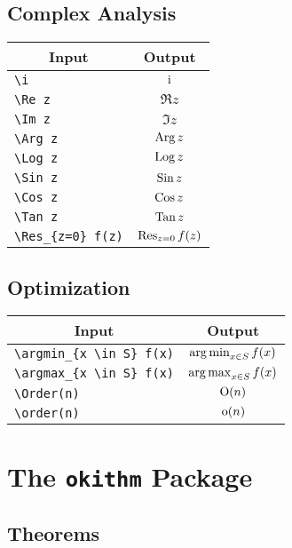 \documentclass[a4paper, 11pt]{article}
\begin{document}
\subsection{Complex Analysis}
\begin{center}
  \begin{tabular}{lc} \toprule
    \multicolumn{1}{c}{Input} & Output            \\\midrule
    \verb|\i|   & $\mathrm{i}$              \\
    \verb|\Re z|   & $\Re z$           \\
    \verb|\Im z|   & $\Im z$           \\
    \verb|\Arg z|   & $\operatorname{Arg} z$          \\
    \verb|\Log z|   & $\operatorname{Log} z$          \\
    \verb|\Sin z|   & $\operatorname{Sin} z$          \\
    \verb|\Cos z|   & $\operatorname{Cos} z$          \\
    \verb|\Tan z|   & $\operatorname{Tan} z$          \\
    \verb|\Res_{z=0} f(z)|   & $\operatorname*{Res}_{z=0} f(z)$ \\
    \bottomrule
  \end{tabular}
\end{center}

\subsection{Optimization}
\begin{center}
  \begin{tabular}{lc} \toprule
    \multicolumn{1}{c}{Input} & Output                   \\\midrule
    \verb|\argmin_{x \in S} f(x)|   & $\operatorname*{arg\,min}_{x \in S} f(x)$ \\
    \verb|\argmax_{x \in S} f(x)|   & $\operatorname*{arg\,max}_{x \in S} f(x)$ \\
    \verb|\Order(n) |   & $\operatorname{O}(n)$              \\
    \verb|\order(n) |  & $\operatorname{o}(n)$              \\
    \bottomrule
  \end{tabular}
\end{center}

\section{The \texttt{okithm} Package}
\subsection{Theorems}
\end{document}
